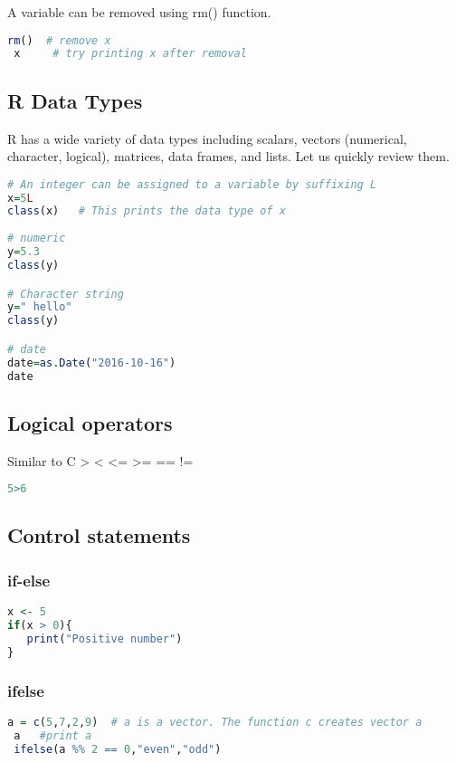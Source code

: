 \documentclass["../Applied_probabillity _and_statistics_lab_KTU.tex"]{subfiles}
\begin{document}
A variable can be removed using rm() function.

 \begin{lstlisting}[language=R]
 rm()  # remove x 
 x     # try printing x after removal
\end{lstlisting}

\subsection{R Data Types}
R has a wide variety of data types including scalars, vectors (numerical, character, logical), matrices, data frames, and lists. Let us quickly review them.
\begin{lstlisting}[language=R]
# An integer can be assigned to a variable by suffixing L
x=5L
class(x)   # This prints the data type of x
 
# numeric 
y=5.3
class(y)

# Character string
y=" hello"
class(y)

# date
date=as.Date("2016-10-16")
date

\end{lstlisting}
 
 \subsection{Logical operators}
 Similar to C > < <= >= == !=
 
\begin{lstlisting}[language=R]
 5>6

\end{lstlisting}
\subsection{Control statements}
 \subsubsection*{if-else}
    \begin{lstlisting}[language=R]
 x <- 5
if(x > 0){
   print("Positive number")
}

\end{lstlisting}
 \subsubsection*{ifelse}
 
    \begin{lstlisting}[language=R]
 a = c(5,7,2,9)  # a is a vector. The function c creates vector a
 a   #print a  
 ifelse(a %% 2 == 0,"even","odd")

\end{lstlisting}
\end{document}

